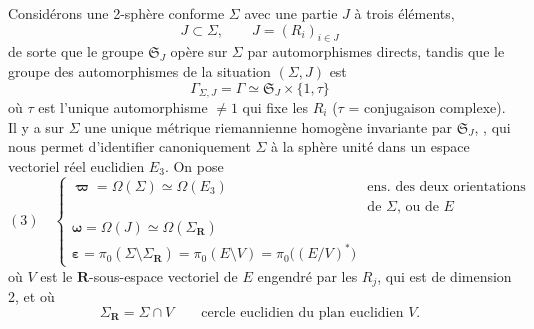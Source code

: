 \documentclass[11pt,a4paper]{article}
\begin{document}
Considérons une 2-sphère conforme $\Sigma$ avec une partie $J$ à trois éléments,
\[
  J \subset \Sigma, \qquad J = (R_i)_{i \in J}
\]
de sorte que le groupe $\mathfrak{S}_J$ opère sur $\Sigma$ par automorphismes
 directs,  tandis que le groupe des
automorphismes   de la
situation $(\Sigma, J)$ est
\[
  \Gamma_{\Sigma,J} = \Gamma \simeq \mathfrak{S}_J \times \{1, \tau\}
\]
où $\tau$ est l'unique automorphisme $\neq 1$ \struck{\ill{}} qui fixe les
$R_i$ \struck{\ill{}} ($\tau$ = conjugaison complexe).
Il y a sur $\Sigma$ une unique métrique riemannienne homogène invariante
 par $\mathfrak{S}_J$,
, qui nous permet d'identifier canoniquement $\Sigma$ à la sphère
unité dans un espace vectoriel réel euclidien $E_3$. On pose
\[
  (3)\quad
  \left\{
  \begin{array}{ll}
    \boldsymbol{\varpi} = \Omega(\Sigma) \simeq \Omega(E_3)
      & \text{ens. des deux orientations} \\
      & \text{de } \Sigma \text{, ou de } E \\
    \boldsymbol{\omega} = \Omega(J) \simeq \Omega(\Sigma_{\mathbf{R}}) & \\
    \boldsymbol{\varepsilon} = \pi_0(\Sigma \setminus \Sigma_{\mathbf{R}})
      = \pi_0(E \setminus V) = \pi_0\big((E/V)^{*}\big) &
  \end{array}
  \right.
\]
où $V$ est le $\mathbf{R}$-sous-espace vectoriel de $E$ engendré par les $R_j$, qui est
de dimension 2, et où
\[
  \Sigma_{\mathbf{R}} = \Sigma \cap V
  \qquad \text{cercle euclidien du plan euclidien } V .
\]
\end{document}
